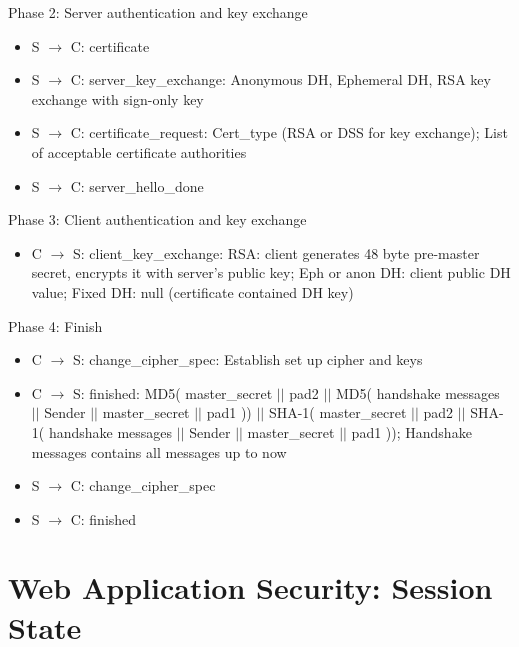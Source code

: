 \documentclass[fs, footer]{latex4ei}
\begin{document}
\begin{multicols*}{4}
{Phase 2:  Server  authentication    and key exchange
\begin{itemize}
	\item S $\rightarrow$ C:  certificate  
	\item S $\rightarrow$ C:  server\_key\_exchange: Anonymous DH, Ephemeral   DH, RSA key exchange    with    sign-only   key 
	\item S $\rightarrow$ C:  certificate\_request: Cert\_type (RSA    or  DSS for key exchange); List  of  acceptable  certificate  authorities  
	\item S $\rightarrow$ C:  server\_hello\_done
\end{itemize}

Phase 3:  Client  authentication and key exchange 
\begin{itemize}
	\item C $\rightarrow$ S: client\_key\_exchange: RSA: client generates 48  byte pre-master  secret, encrypts it  with server’s 
	public  key; Eph or  anon DH: client  public  DH  value; Fixed DH: null (certificate contained DH  key)   
\end{itemize}

Phase 4: Finish 
\begin{itemize}
	\item C $\rightarrow$ S: change\_cipher\_spec: Establish set up cipher and keys 
	\item C $\rightarrow$ S: finished: MD5( master\_secret $||$ pad2 $||$ MD5( handshake messages $||$ Sender $||$ master\_secret $||$ pad1 )) $||$ SHA-1( master\_secret $||$ pad2 $||$ SHA-1( handshake messages $||$ Sender $||$ master\_secret $||$ pad1 )); Handshake messages contains all messages up to now 
	\item S $\rightarrow$ C: change\_cipher\_spec
	\item S $\rightarrow$ C: finished 
\end{itemize}
}
\section{Web Application Security: Session State}
 \sectionbox {
}
\end{multicols*}
\end{document}
